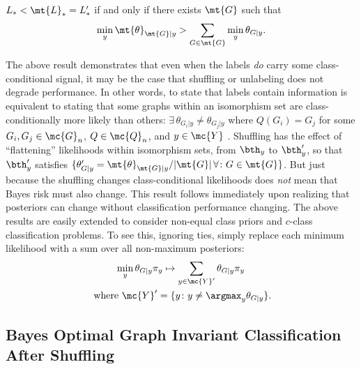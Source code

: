 \documentclass[10pt,journal,cspaper,compsoc]{IEEEtran}
\newcommand{\Qs}{Q}
\begin{document}
\begin{thm} \label{thm:2}
	$L_* < \mt{L}_*=L'_*$ if and only if there exists $\mt{G}$ such that
	$$\min_y \mt{\theta}_{\mt{G}|y} > \sum_{G \in \mt{G}}\min_y \theta_{G|y}.$$
\end{thm}
The above result demonstrates that even when the labels \emph{do} carry some class-conditional signal, it may be the case that shuffling or unlabeling does not degrade performance.  In other words, to state that labels contain information is equivalent to stating that some graphs within an isomorphism set are class-conditionally more likely than others: $\exists \, \theta_{G_i|y} \neq \theta_{G_j|y}$ where $\Qs(G_i)=G_j$ for some $G_i,G_j \in \mc{G}_n$, $\Qs \in \mc{Q}_n$, and $y \in \mc{Y}$%
.  Shuffling has the effect of ``flattening'' likelihoods within isomorphism sets, from $\bth_y$ to $\bth_y'$, so that $\bth_y'$ satisfies $\{\theta_{G|y}'=\mt{\theta}_{\mt{G}|y}/|\mt{G}| \, \forall \colon G \in \mt{G}\}$.  But just because the shuffling changes class-conditional likelihoods does \emph{not} mean that Bayes risk must also change. This result follows immediately upon realizing that posteriors can change without classification performance changing.  The above results are easily extended to consider non-equal class priors and $c$-class classification problems.  To see this, ignoring ties, simply replace each minimum likelihood with a sum over all non-maximum posteriors: 
\begin{multline}
\min_y \theta_{G|y} \pi_y \mapsto \sum_{y \in \mc{Y}'} \theta_{G|y} \pi_y \\ \text{ where } \mc{Y}' =\{y \colon y \neq \argmax_y \theta_{G|y}\}.
\end{multline}

\subsection{Bayes Optimal Graph Invariant Classification After Shuffling} %
\label{sec:gi}
\end{document}
